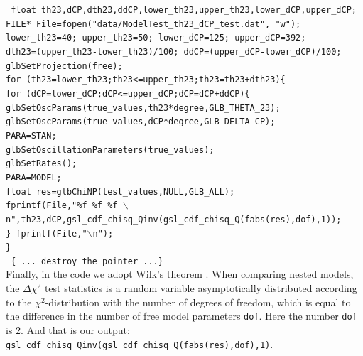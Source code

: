 \documentclass[aps,prd,nofootinbib,preprint]{revtex4}
\begin{document}
\texttt{
    float th23,dCP,dth23,ddCP,lower\_th23,upper\_th23,lower\_dCP,upper\_dCP;\\
    FILE* File=fopen("data/ModelTest\_th23\_dCP\_test.dat", "w");\\
    lower\_th23=40; upper\_th23=50; lower\_dCP=125; upper\_dCP=392;\\
    dth23=(upper\_th23-lower\_th23)/100; ddCP=(upper\_dCP-lower\_dCP)/100;\\
    glbSetProjection(free);\\
    for (th23=lower\_th23;th23<=upper\_th23;th23=th23+dth23)\{\\
    for (dCP=lower\_dCP;dCP<=upper\_dCP;dCP=dCP+ddCP)\{\\
    glbSetOscParams(true\_values,th23*degree,GLB\_THETA\_23);\\
    glbSetOscParams(true\_values,dCP*degree,GLB\_DELTA\_CP);\\
    PARA=STAN; \\
    glbSetOscillationParameters(true\_values);\\
    glbSetRates();\\
    PARA=MODEL;\\ 
        float res=glbChiNP(test\_values,NULL,GLB\_ALL);\\
            fprintf(File,"\%f \%f \%f $\backslash$n",th23,dCP,gsl\_cdf\_chisq\_Qinv(gsl\_cdf\_chisq\_Q(fabs(res),dof),1));\\
         \} fprintf(File,"$\backslash$n");\\
    \}
}\vspace{0.2cm}\\
\texttt{ \{ ...  destroy the pointer ...\}}\vspace{0.2cm}\\
Finally, in the code we adopt Wilk's theorem \cite{Wilks:1938dza}. When comparing nested models, the $\Delta \chi^2$ test statistics is a random variable asymptotically distributed according to the $\chi^2$-distribution with the number of degrees of freedom, which is equal to the difference in the number of free model parameters \texttt{dof}. Here the number \texttt{dof} is $2$. And that is our output: \texttt{gsl\_cdf\_chisq\_Qinv(gsl\_cdf\_chisq\_Q(fabs(res),dof),1)}.
\end{document}
